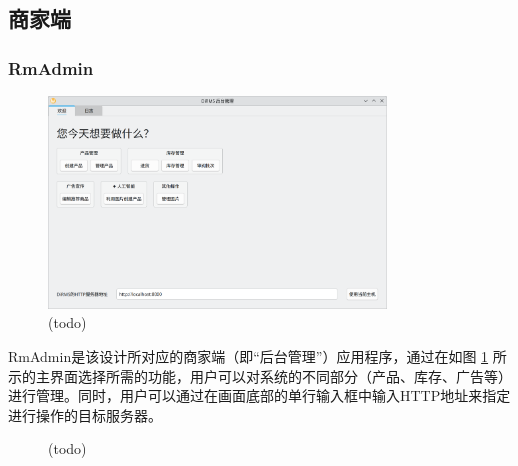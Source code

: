 \subsection{商家端}

\subsubsection{RmAdmin}

\begin{figure}[htbp]
	\centering
	\includegraphics[width=0.8\textwidth]{./exp/rma-index.png}
	\caption{(todo)}
	\label{fig:rma-index}
\end{figure}

RmAdmin是该设计所对应的商家端（即“后台管理”）应用程序，通过在如图 \ref{fig:rma-index} 所示的主界面选择所需的功能，用户可以对系统的不同部分（产品、库存、广告等）进行管理。同时，用户可以通过在画面底部的单行输入框中输入HTTP地址来指定进行操作的目标服务器。

\begin{figure}[htbp]
    \hfill
	\caption{(todo)}
	\label{fig:rma-im-add}
\end{figure}

